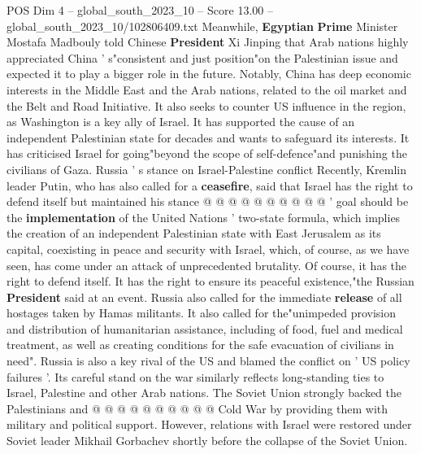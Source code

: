 \begin{textsample}{POS Dim 4 – global\_south\_2023\_10 – Score 13.00 – global\_south\_2023\_10/102806409.txt}
Meanwhile, \textbf{Egyptian} \textbf{Prime} Minister Mostafa Madbouly told Chinese \textbf{President} Xi Jinping that Arab nations highly appreciated China ' s"consistent and just position"on the Palestinian issue and expected it to play a bigger role in the future.
Notably, China has deep economic interests in the Middle East and the Arab nations, related to the oil market and the Belt and Road Initiative.
It also seeks to counter US influence in the region, as Washington is a key ally of Israel.
It has supported the cause of an independent Palestinian state for decades and wants to safeguard its interests.
It has criticised Israel for going"beyond the scope of self-defence"and punishing the civilians of Gaza.
Russia ' s stance on Israel-Palestine conflict Recently, Kremlin leader Putin, who has also called for a \textbf{ceasefire}, said that Israel has the right to defend itself but maintained his stance @ @ @ @ @ @ @ @ @ @ ' goal should be the \textbf{implementation} of the United Nations ' two-state formula, which implies the creation of an independent Palestinian state with East Jerusalem as its capital, coexisting in peace and security with Israel, which, of course, as we have seen, has come under an attack of unprecedented brutality.
Of course, it has the right to defend itself.
It has the right to ensure its peaceful existence,"the Russian \textbf{President} said at an event.
Russia also called for the immediate \textbf{release} of all hostages taken by Hamas militants.
It also called for the"unimpeded provision and distribution of humanitarian assistance, including of food, fuel and medical treatment, as well as creating conditions for the safe evacuation of civilians in need".
Russia is also a key rival of the US and blamed the conflict on ' US policy failures '.
Its careful stand on the war similarly reflects long-standing ties to Israel, Palestine and other Arab nations.
The Soviet Union strongly backed the Palestinians and @ @ @ @ @ @ @ @ @ @ Cold War by providing them with military and political support.
However, relations with Israel were restored under Soviet leader Mikhail Gorbachev shortly before the collapse of the Soviet Union.

\end{textsample}
